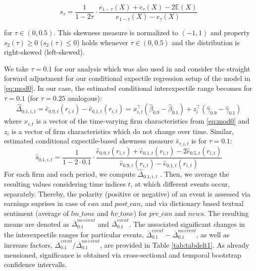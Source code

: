 \documentclass[]{article}
\begin{document}
\[s_{\tau} = \frac 1{1-2\tau}\cdot\frac{e_{1-\tau}(X) + e_\tau(X) - 2\mathbb E(X)}{e_{1-\tau}(X) - e_\tau(X)}\]

for \(\tau\in(0,0.5).\) This skewness measure is normalized to \((-1,1)\) and property \(s_2(\tau)\geq 0\) (\(s_2(\tau)\leq 0\)) holds whenever \(\tau\in(0,0.5)\) and the distribution is right-skewed (left-skewed).

We take \(\tau=0.1\) for our analysis which was also used in \cite{eberl2022sk} and consider the straight forward adjustment for our conditional expectile regression setup of the model in \eqref{eq:mod0}. In our case, the estimated conditional interexpectile range becomes for \(\tau=0.1\) (for \(\tau=0.25\) analogous):
\[\hat\Delta_{0.1,i,t} = \hat e_{0.9,t}(r_{i,t}) - \hat e_{0.1,t}(r_{i,t}) = x_{i,t}^\top (\hat\beta_{0.9} - \hat\beta_{0.1}) + z_i^\top(\hat\gamma_{0.9} - \hat\gamma_{0.1})\]
where \(x_{i,t}\) is a vector of the time-varying firm characteristics from \eqref{eq:mod0} and \(z_i\) is a vector of firm characteristics which do not change over time. Similar, estimated conditional expectile-based skewness measure \(\hat s_{\tau,i,t}\) is for \(\tau=0.1\):
\[\hat s_{0.1,i,t} = \frac 1{1-2\cdot0.1}\cdot\frac{\hat e_{0.9,t}(r_{i,t}) + \hat e_{0.1,t}(r_{i,t}) - 2\hat e_{0.5,t}(r_{i,t})}{\hat e_{0.9,t}(r_{i,t}) - \hat e_{0.1,t}(r_{i,t})}\]
For each firm and each period, we compute \(\hat\Delta_{0.1,i,t}\) . Then, we average the resulting values considering time indices \(t\), at which different events occur, separately. Thereby, the polarity (positive or negative) of an event is assessed via earnings suprises in case of $ean$ and $post\_ean$, and via dictionary based textual sentiment (average of $lm\_tone$ and $hv\_tone$) for $pre\_ean$ and $news$. The resulting means are denoted as \(\overline\Delta_{0.1}^{no~event}\) and \(\overline\Delta_{0.1}^{event}\). The associated significant changes in the interexpectile ranges for particular events, \(\overline\Delta^{event}_{0.1}-\overline\Delta^{no~event}_{0.1}\), as well as increase factors, \(\overline\Delta^{event}_{0.1}/\overline\Delta^{no~event}_{0.1}\), are provided in Table \ref{tab:tabdelt1}. As already mensioned, significance is obtained via cross-sectional and temporal bootstrap confidence intervalls.
\end{document}
